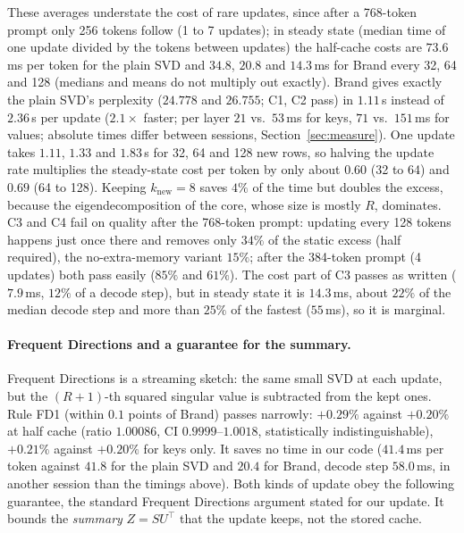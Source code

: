 \documentclass[10pt]{article}
\theoremstyle{plain}
\theoremstyle{definition}
\theoremstyle{remark}
\newcommand{\T}{^{\top}}
\newcommand{\rl}[1]{\textsf{#1}}%
\begin{document}
These averages understate the cost of rare updates, since after a 768-token prompt only 256 tokens follow (1 to 7 updates); in steady state (median time of one update divided by the tokens between updates) the half-cache costs are $73.6$\,ms per token for the plain SVD and $34.8$, $20.8$ and $14.3$\,ms for Brand every 32, 64 and 128 (medians and means do not multiply out exactly). Brand gives exactly the plain SVD's perplexity ($24.778$ and $26.755$; \rl{C1}, \rl{C2} pass) in $1.11$\,s instead of $2.36$\,s per update ($2.1\times$ faster; per layer $21$ vs.\ $53$\,ms for keys, $71$ vs.\ $151$\,ms for values; absolute times differ between sessions, Section~\ref{sec:measure}). One update takes $1.11$, $1.33$ and $1.83$\,s for 32, 64 and 128 new rows, so halving the update rate multiplies the steady-state cost per token by only about $0.60$ (32 to 64) and $0.69$ (64 to 128). Keeping $k_{\mathrm{new}}=8$ saves $4\%$ of the time but doubles the excess, because the eigendecomposition of the core, whose size is mostly $R$, dominates. \rl{C3} and \rl{C4} fail on quality after the 768-token prompt: updating every 128 tokens happens just once there and removes only $34\%$ of the static excess (half required), the no-extra-memory variant $15\%$; after the 384-token prompt (4 updates) both pass easily ($85\%$ and $61\%$). The cost part of \rl{C3} passes as written ($7.9$\,ms, $12\%$ of a decode step), but in steady state it is $14.3$\,ms, about $22\%$ of the median decode step and more than $25\%$ of the fastest ($55$\,ms), so it is marginal.

\paragraph{Frequent Directions and a guarantee for the summary.}
Frequent Directions \cite{liberty2013,ghashami2016} is a streaming sketch: the same small SVD at each update, but the $(R+1)$-th squared singular value is subtracted from the kept ones. Rule \rl{FD1} (within $0.1$ points of Brand) passes narrowly: $+0.29\%$ against $+0.20\%$ at half cache (ratio $1.00086$, CI $0.9999$--$1.0018$, statistically indistinguishable), $+0.21\%$ against $+0.20\%$ for keys only. It saves no time in our code ($41.4$\,ms per token against $41.8$ for the plain SVD and $20.4$ for Brand, decode step $58.0$\,ms, in another session than the timings above). Both kinds of update obey the following guarantee, the standard Frequent Directions argument \cite{liberty2013,ghashami2016} stated for our update. It bounds the \emph{summary} $Z=SU\T$ that the update keeps, not the stored cache.
\end{document}
